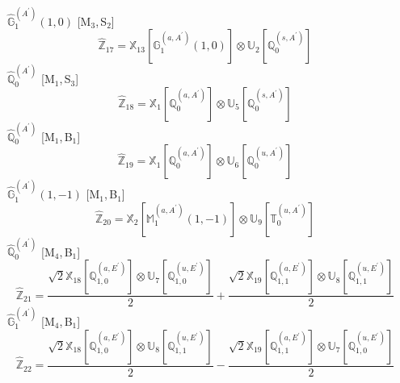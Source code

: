 \documentclass[fleqn,10pt,landscape]{article}
\begin{document}
\begin{itemize}
\begin{dmath*}
\end{dmath*}
\vspace{4mm}
\noindent {} $\,\,\,\hat{\mathbb{G}}_{1}^{(A^{\prime})}(1,0)$ [M$_{3}$,\,S$_{2}$]
\begin{dmath*}
\hat{\mathbb{Z}}_{17}=\mathbb{X}_{13}[\mathbb{G}_{1}^{(a,A^{\prime})}(1,0)] \otimes\mathbb{U}_{2}[\mathbb{Q}_{0}^{(s,A^{\prime})}]
\end{dmath*}
\vspace{4mm}
\noindent {} $\,\,\,\hat{\mathbb{Q}}_{0}^{(A^{\prime})}$ [M$_{1}$,\,S$_{3}$]
\begin{dmath*}
\hat{\mathbb{Z}}_{18}=\mathbb{X}_{1}[\mathbb{Q}_{0}^{(a,A^{\prime})}] \otimes\mathbb{U}_{5}[\mathbb{Q}_{0}^{(s,A^{\prime})}]
\end{dmath*}
\vspace{4mm}
\noindent {} $\,\,\,\hat{\mathbb{Q}}_{0}^{(A^{\prime})}$ [M$_{1}$,\,B$_{1}$]
\begin{dmath*}
\hat{\mathbb{Z}}_{19}=\mathbb{X}_{1}[\mathbb{Q}_{0}^{(a,A^{\prime})}] \otimes\mathbb{U}_{6}[\mathbb{Q}_{0}^{(u,A^{\prime})}]
\end{dmath*}
\vspace{4mm}
\noindent {} $\,\,\,\hat{\mathbb{G}}_{1}^{(A^{\prime})}(1,-1)$ [M$_{1}$,\,B$_{1}$]
\begin{dmath*}
\hat{\mathbb{Z}}_{20}=\mathbb{X}_{2}[\mathbb{M}_{1}^{(a,A^{\prime})}(1,-1)] \otimes\mathbb{U}_{9}[\mathbb{T}_{0}^{(u,A^{\prime})}]
\end{dmath*}
\vspace{4mm}
\noindent {} $\,\,\,\hat{\mathbb{Q}}_{0}^{(A^{\prime})}$ [M$_{4}$,\,B$_{1}$]
\begin{dmath*}
\hat{\mathbb{Z}}_{21}=\frac{\sqrt{2} \mathbb{X}_{18}[\mathbb{Q}_{1,0}^{(a,E^{\prime})}] \otimes\mathbb{U}_{7}[\mathbb{Q}_{1,0}^{(u,E^{\prime})}]}{2} + \frac{\sqrt{2} \mathbb{X}_{19}[\mathbb{Q}_{1,1}^{(a,E^{\prime})}] \otimes\mathbb{U}_{8}[\mathbb{Q}_{1,1}^{(u,E^{\prime})}]}{2}
\end{dmath*}
\vspace{4mm}
\noindent {} $\,\,\,\hat{\mathbb{G}}_{1}^{(A^{\prime})}$ [M$_{4}$,\,B$_{1}$]
\begin{dmath*}
\hat{\mathbb{Z}}_{22}=\frac{\sqrt{2} \mathbb{X}_{18}[\mathbb{Q}_{1,0}^{(a,E^{\prime})}] \otimes\mathbb{U}_{8}[\mathbb{Q}_{1,1}^{(u,E^{\prime})}]}{2} - \frac{\sqrt{2} \mathbb{X}_{19}[\mathbb{Q}_{1,1}^{(a,E^{\prime})}] \otimes\mathbb{U}_{7}[\mathbb{Q}_{1,0}^{(u,E^{\prime})}]}{2}
\end{dmath*}

\end{itemize}
\end{document}
